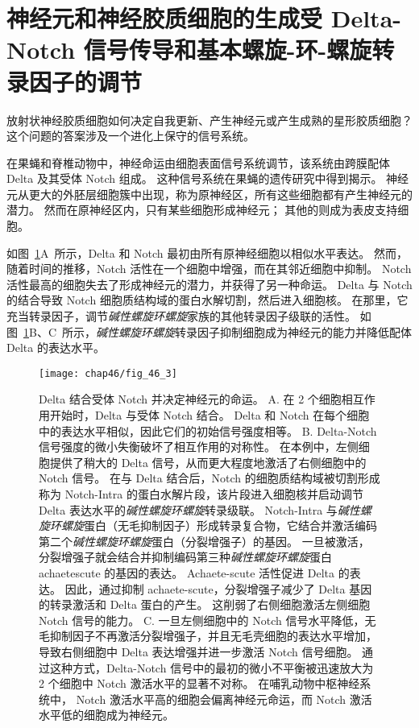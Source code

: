 \section{神经元和神经胶质细胞的生成受 Delta-Notch 信号传导和基本螺旋-环-螺旋转录因子的调节}

放射状神经胶质细胞如何决定自我更新、产生神经元或产生成熟的星形胶质细胞？
这个问题的答案涉及一个进化上保守的信号系统。


在果蝇和脊椎动物中，神经命运由细胞表面信号系统调节，该系统由跨膜配体 Delta 及其受体 Notch 组成。
这种信号系统在果蝇的遗传研究中得到揭示。
神经元从更大的外胚层细胞簇中出现，称为原神经区，所有这些细胞都有产生神经元的潜力。
然而在原神经区内，只有某些细胞形成神经元；
其他的则成为表皮支持细胞。 


如图~\ref{fig:46_3}A~所示，Delta 和 Notch 最初由所有原神经细胞以相似水平表达。
然而，随着时间的推移，Notch 活性在一个细胞中增强，而在其邻近细胞中抑制。
Notch 活性最高的细胞失去了形成神经元的潜力，并获得了另一种命运。
Delta 与 Notch 的结合导致 Notch 细胞质结构域的蛋白水解切割，然后进入细胞核。
在那里，它充当转录因子，调节\textit{碱性螺旋环螺旋}家族的其他转录因子级联的活性。
如图~\ref{fig:46_3}B、C~所示，\textit{碱性螺旋环螺旋}转录因子抑制细胞成为神经元的能力并降低配体 Delta 的表达水平。


\begin{figure}[htbp]
	\centering
	\texttt{[image: chap46/fig\_46\_3]}
	\caption{Delta 结合受体 Notch 并决定神经元的命运。
		A. 在 2 个细胞相互作用开始时，Delta 与受体 Notch 结合。
		Delta 和 Notch 在每个细胞中的表达水平相似，因此它们的初始信号强度相等。
		B. Delta-Notch 信号强度的微小失衡破坏了相互作用的对称性。
		在本例中，左侧细胞提供了稍大的 Delta 信号，从而更大程度地激活了右侧细胞中的 Notch 信号。
		在与 Delta 结合后，Notch 的细胞质结构域被切割形成称为 Notch-Intra 的蛋白水解片段，该片段进入细胞核并启动调节 Delta 表达水平的\textit{碱性螺旋环螺旋}转录级联。
		Notch-Intra 与\textit{碱性螺旋环螺旋}蛋白（无毛抑制因子）形成转录复合物，它结合并激活编码第二个\textit{碱性螺旋环螺旋}蛋白（分裂增强子）的基因。
		一旦被激活，分裂增强子就会结合并抑制编码第三种\textit{碱性螺旋环螺旋}蛋白 achaetescute 的基因的表达。
		Achaete-scute 活性促进 Delta 的表达。
		因此，通过抑制 achaete-scute，分裂增强子减少了 Delta 基因的转录激活和 Delta 蛋白的产生。
		这削弱了右侧细胞激活左侧细胞 Notch 信号的能力。
		C. 一旦左侧细胞中的 Notch 信号水平降低，无毛抑制因子不再激活分裂增强子，并且无毛壳细胞的表达水平增加，导致右侧细胞中 Delta 表达增强并进一步激活 Notch 信号细胞。
		通过这种方式，Delta-Notch 信号中的最初的微小不平衡被迅速放大为 2 个细胞中 Notch 激活水平的显著不对称。
		在哺乳动物中枢神经系统中， Notch 激活水平高的细胞会偏离神经元命运，而 Notch 激活水平低的细胞成为神经元。}
	\label{fig:46_3}
\end{figure}


